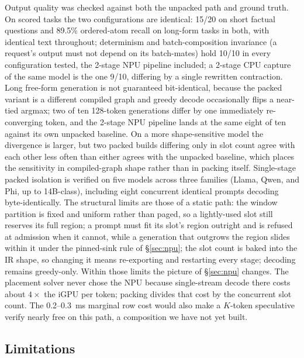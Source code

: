 \documentclass[11pt]{article}
\begin{document}
Output quality was checked against both the unpacked path and ground truth. On scored tasks the two configurations are identical: 15/20 on short factual questions and 89.5\% ordered-atom recall on long-form tasks in both, with identical text throughout; determinism and batch-composition invariance (a request's output must not depend on its batch-mates) hold 10/10 in every configuration tested, the 2-stage NPU pipeline included; a 2-stage CPU capture of the same model is the one 9/10, differing by a single rewritten contraction. Long free-form generation is not guaranteed bit-identical, because the packed variant is a different compiled graph and greedy decode occasionally flips a near-tied argmax; two of ten 128-token generations differ by one immediately re-converging token, and the 2-stage NPU pipeline lands at the same eight of ten against its own unpacked baseline. On a more shape-sensitive model the divergence is larger, but two packed builds differing only in slot count agree with each other less often than either agrees with the unpacked baseline, which places the sensitivity in compiled-graph shape rather than in packing itself. Single-stage packed isolation is verified on five models across three families (Llama, Qwen, and Phi, up to 14B-class), including eight concurrent identical prompts decoding byte-identically. The structural limits are those of a static path: the window partition is fixed and uniform rather than paged, so a lightly-used slot still reserves its full region; a prompt must fit its slot's region outright and is refused at admission when it cannot, while a generation that outgrows the region slides within it under the pinned-sink rule of \S\ref{sec:npu}; the slot count is baked into the IR shape, so changing it means re-exporting and restarting every stage; decoding remains greedy-only. Within those limits the picture of \S\ref{sec:npu} changes. The placement solver never chose the NPU because single-stream decode there costs about $4\times$ the iGPU per token; packing divides that cost by the concurrent slot count. The 0.2--0.3~ms marginal row cost would also make a $K$-token speculative verify nearly free on this path, a composition we have not yet built.

\subsection{Limitations}
\end{document}
